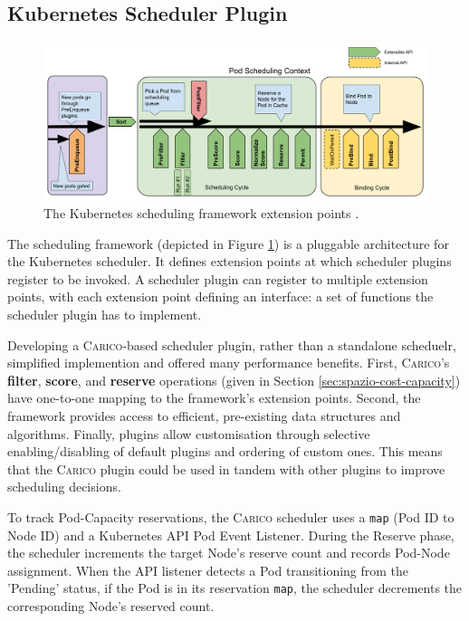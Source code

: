 \subsection{Kubernetes Scheduler Plugin}
\begin{figure}[H]
    \centering
    \includegraphics[width=\textwidth]{images/scheduling-framework-extensions.png}
    \caption{The Kubernetes scheduling framework extension points
    \cite{scheduling-framework}.}
    \label{fig:kube-sched-framework}
\end{figure}
The scheduling framework (depicted in Figure \ref{fig:kube-sched-framework}) is
a pluggable architecture for the Kubernetes scheduler. It defines extension
points at which scheduler plugins register to be invoked. A scheduler plugin can
register to multiple extension points, with each extension point defining an
interface: a set of functions the scheduler plugin has to implement.

Developing a \textsc{Carico}-based scheduler plugin, rather than a standalone
scheduelr, simplified implemention and offered many performance benefits. First,
\textsc{Carico}'s \textbf{filter}, \textbf{score}, and \textbf{reserve}
operations (given in Section \ref{sec:spazio-cost-capacity}) have one-to-one
mapping to the framework's extension points. Second, the framework provides
access to efficient, pre-existing data structures and algorithms. Finally,
plugins allow customisation through selective enabling/disabling of default
plugins and ordering of custom ones. This means that the \textsc{Carico} plugin
could be used in tandem with other plugins to improve scheduling decisions.

To track Pod-Capacity reservations, the \textsc{Carico} scheduler uses a
\verb|map| (Pod ID to Node ID) and a Kubernetes API Pod Event Listener. During
the Reserve phase, the scheduler increments the target Node's reserve count and
records Pod-Node assignment. When the API listener detects a Pod transitioning
from the 'Pending' status, if the Pod is in its reservation \verb|map|, the
scheduler decrements the corresponding Node's reserved count.
